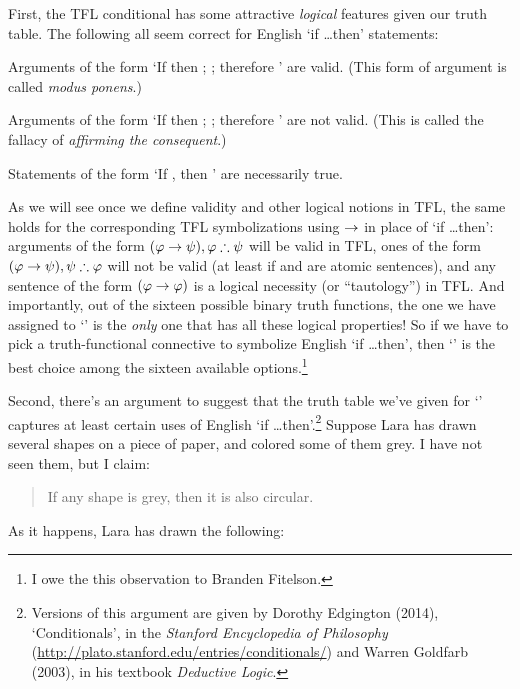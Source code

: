 First, the TFL conditional has some attractive \emph{logical} features given our truth table. The following all seem correct for English `if \ldots then' statements:
\begin{ebullet}
\item Arguments of the form `If \meta{\varphi} then \meta{\psi}; \meta{\varphi}; therefore \meta{\psi}' are valid.  (This form of argument is called \emph{modus ponens}.)
\item Arguments of the form `If \meta{\varphi} then \meta{\psi}; \meta{\psi}; therefore \meta{\varphi}' are not valid.  (This is called the fallacy of \emph{affirming the consequent}.)
\item Statements of the form `If \meta{\varphi}, then \meta{\varphi}' are necessarily true.
\end{ebullet}
As we will see once we define validity and other logical notions in TFL, the same holds for the corresponding TFL symbolizations using $\rightarrow$ in place of `if \ldots then': arguments of the form $(\mathcal{\varphi} \rightarrow \mathcal{\psi}), \mathcal{\varphi} \therefore \mathcal{\psi}$ will be valid in TFL, ones of the form $(\mathcal{\varphi} \rightarrow \mathcal{\psi}), \mathcal{\psi} \therefore \mathcal{\varphi}$ will not be valid (at least if \meta{\varphi} and \meta{\psi} are atomic sentences), and any sentence of the form $(\mathcal{\varphi} \rightarrow \mathcal{\varphi})$ is a logical necessity (or ``tautology'') in TFL.  And importantly, out of the sixteen possible binary truth functions, the one we have assigned to `\eif' is the \emph{only} one that has all these logical properties!  So if we have to pick a truth-functional connective to symbolize English `if \ldots then', then `\eif' is the best choice among the sixteen available options.\footnote{I owe the this observation to Branden Fitelson.} 

Second, there's an argument to suggest that the truth table we've given for `\eif' captures at least certain uses of English `if \ldots then'.\footnote{Versions of this argument are given by Dorothy Edgington (2014), `Conditionals', in the \emph{Stanford Encyclopedia of Philosophy} (\url{http://plato.stanford.edu/entries/conditionals/}) and Warren Goldfarb (2003), in his textbook \emph{Deductive Logic}.}    Suppose Lara has drawn several shapes on a piece of paper, and colored some of them grey. I have not seen them, but I claim:
	\begin{quote}
		If any shape is grey, then it is also circular.
	\end{quote}
As it happens, Lara has drawn the following:

